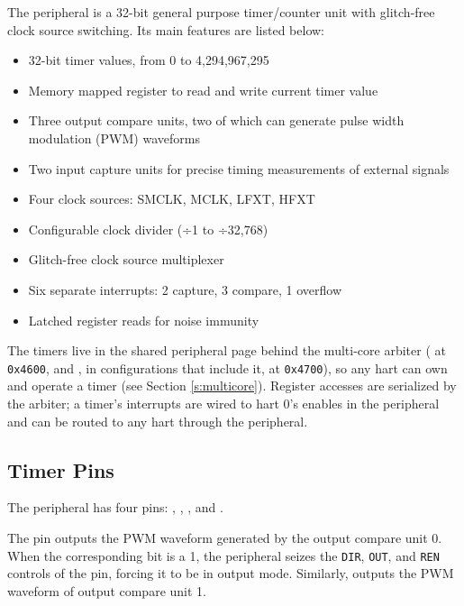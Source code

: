 The  peripheral is a 32-bit general purpose timer/counter unit with glitch-free clock source switching. Its main features are listed below:

\begin{itemize}
	\item 32-bit timer values, from 0 to 4,294,967,295
	\item Memory mapped register to read and write current timer value
	\item Three output compare units, two of which can generate pulse width modulation (PWM) waveforms
	\item Two input capture units for precise timing measurements of external signals
	\item Four clock sources: SMCLK, MCLK, LFXT, HFXT
	\item Configurable clock divider (÷1 to ÷32,768)
	\item Glitch-free clock source multiplexer
	\item Six separate interrupts: 2 capture, 3 compare, 1 overflow
	\item Latched register reads for noise immunity
\end{itemize}

The timers live in the shared peripheral page behind the multi-core arbiter ( at \texttt{0x4600}, and , in configurations that include it, at \texttt{0x4700}), so any hart can own and operate a timer (see Section \ref{s:multicore}). Register accesses are serialized by the arbiter; a timer's interrupts are wired to hart 0's enables in the  peripheral and can be routed to any hart through the  peripheral.



\subsection{Timer Pins}

The  peripheral has four pins: , , , and .

The  pin outputs the PWM waveform generated by the output compare unit 0. When the corresponding  bit is a 1, the  peripheral seizes the \texttt{DIR}, \texttt{OUT}, and \texttt{REN} controls of the pin, forcing it to be in output mode. Similarly,  outputs the PWM waveform of output compare unit 1.

